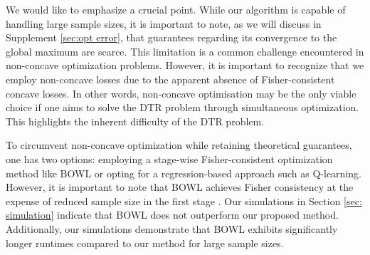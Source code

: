 \documentclass[preprint] {imsart}
\begin{document}
 

{\color{black}  We\label{non-concave 2} would like to emphasize a crucial point. While our algorithm is capable of handling large sample sizes, it is important to note, as we will discuss in Supplement \ref{sec:opt error}, that guarantees regarding its convergence to the global maximum are scarce. This limitation is a common challenge encountered in non-concave optimization problems. However, it is important to recognize that we employ non-concave losses due to the apparent absence of Fisher-consistent concave losses. In other words, non-concave optimisation may be the only viable choice if one aims to solve the DTR problem through simultaneous optimization. This highlights the inherent difficulty of the DTR problem.

To circumvent non-concave optimization while retaining theoretical guarantees, one has two options: employing a stage-wise Fisher-consistent optimization method like BOWL or opting for a regression-based approach such as Q-learning. However, it is important to note that BOWL achieves Fisher consistency at the expense of reduced sample size in the first stage \cite{zhao2015}. Our simulations in Section \ref{sec: simulation} indicate that BOWL does not outperform our proposed method. Additionally, our simulations demonstrate that BOWL exhibits significantly longer runtimes compared to our method for large sample sizes.}
\end{document}
